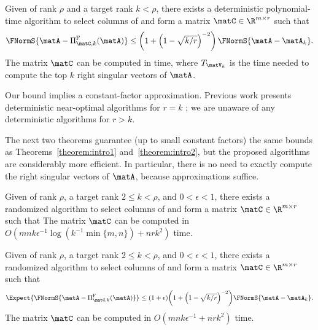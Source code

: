 \begin{theorem}
\label{theorem:intro2}
Given  of rank $\rho$ and a target rank $k <\rho$,
there exists a deterministic
polynomial-time algorithm to
select  columns of \math{\matA} and form a matrix
$\matC\in\R^{m \times r}$
such that
$$ \FNormS{\matA - \Pi_{\matC,k}^{\mathrm{F}}(\matA)} \leq \textstyle
\left(1 +  \left(1 - \sqrt{ k/r }\right)^{-2}  \right)
\FNormS{\matA - \matA_k}.$$
The matrix $\matC$ can be computed in
 time, where $T_{\matV_k}$ is the time needed to compute the top $k$ right singular vectors of $\matA$.
\end{theorem}


Our bound implies a constant-factor approximation.
Previous work presents deterministic near-optimal algorithms for $r=k$ \cite{DR10}; we are unaware of any deterministic algorithms for $r>k$.

The next two theorems guarantee (up to small constant factors) the same bounds as Theorems~\ref{theorem:intro1} and~\ref{theorem:intro2},
but the proposed algorithms are considerably more efficient. In particular, there is no need to exactly compute the right singular vectors of $\matA$,
because approximations suffice.

\begin{theorem}
\label{thmFast1}
Given  of rank $\rho$, a target rank $2\leq k < \rho$, and $0 < \epsilon < 1$,
there exists a randomized algorithm to select  columns of \math{\matA} and form a matrix
$\matC\in\R^{m \times r}$ such that
The matrix $\matC$ can be computed in $O\left(mnk\epsilon^{-1}
\log\left( k^{-1}\min\{m,n\}\right)+nrk^2\right)$ time.
\end{theorem}
\begin{theorem}
\label{thmFast2}
Given  of rank $\rho$, a
target rank $2\leq k < \rho$, and  $0 < \epsilon < 1$,
there exists a randomized algorithm to
select  columns of \math{\matA} and form a matrix
$\matC\in\R^{m \times r}$ such that
$$
\Expect{\FNormS{\matA - \Pi_{\matC,k}^{\mathrm{F}}(\matA)}} \leq
\textstyle
(1+\epsilon){
\left(1 + \left(1 - \sqrt{ k/r }\right)^{-2} \right)
}
\FNormS{\matA - \matA_k}.$$
The matrix $\matC$ can be computed in $O\left(mnk\epsilon^{-1}+nrk^2\right)$ time.
\end{theorem}

